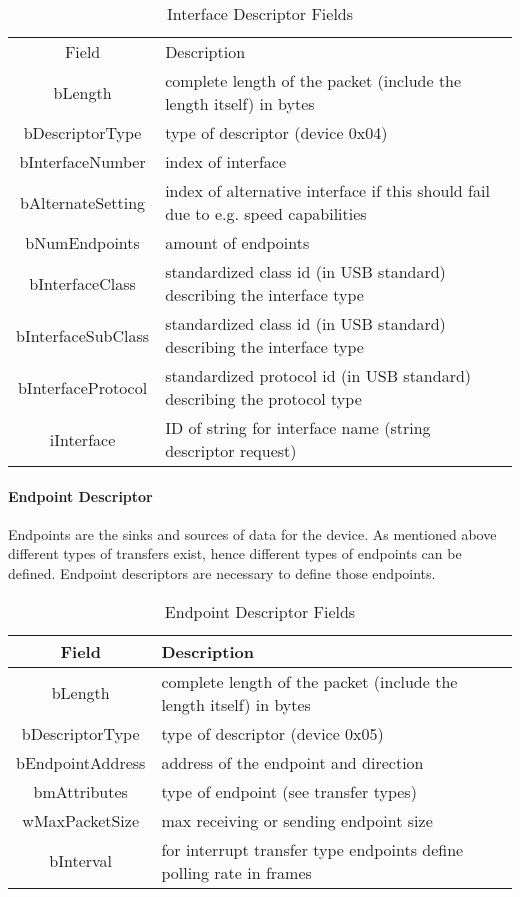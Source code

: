 \begin{table}
\begin{tabular}{c|p{10 cm}}
Field & Description \\
bLength &  complete length of the packet (include the length itself) in bytes \\
bDescriptorType &  type of descriptor (device 0x04) \\
bInterfaceNumber & index of interface \\
bAlternateSetting & index of alternative interface if this should fail due to e.g. speed capabilities \\
bNumEndpoints & amount of endpoints \\
bInterfaceClass & standardized class id (in USB standard) describing the interface type \\
bInterfaceSubClass & standardized class id (in USB standard) describing the interface type \\
bInterfaceProtocol & standardized protocol id (in USB standard) describing the protocol type \\
iInterface & ID of string for interface name (string descriptor request) \\
\end{tabular}
 \caption{Interface Descriptor Fields}
\end{table}
\paragraph{Endpoint Descriptor} 

Endpoints are the sinks and sources of data for the device. As mentioned above different types of transfers exist, hence different types of 
endpoints can be defined. Endpoint descriptors are necessary to define those endpoints.

\begin{table}
\begin{tabular}{c|p{10 cm}}
Field & Description \\ \hline
bLength & complete length of the packet (include the length itself) in bytes \\
bDescriptorType & type of descriptor (device 0x05) \\
bEndpointAddress & address of the endpoint and direction\\
bmAttributes & type of endpoint (see transfer types)\\
wMaxPacketSize & max receiving or sending endpoint size\\
bInterval & for interrupt transfer type endpoints define polling rate in frames\\
\end{tabular}
 \caption{Endpoint Descriptor Fields}
\end{table}

